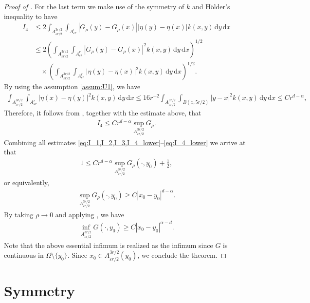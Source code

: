 \documentclass[reqno]{amsart}
\theoremstyle{plain}
\theoremstyle{definition}
\numberwithin{equation}{section}
\newcommand{\dx} {\, \mathrm{d}x}
\newcommand{\dy} {\, \mathrm{d}y}
\begin{document}
\begin{proof} [Proof of ]
For the last term we make use of the symmetry of $k$ and H\"older's inequality to have
\begin{align*}
I_4 
&\leq 2\int_{A^{3r/2}_{\varepsilon r/2}} \int_{A^r_{\varepsilon r}}
| G_{\rho}(y) - G_{\rho}(x) | | \eta(y) - \eta(x) | k(x,y) \dy \dx \\
&\leq 2 \left( \int_{A^{3r/2}_{\varepsilon r/2}} \int_{A^r_{\varepsilon r}}
| G_{\rho}(y) - G_{\rho}(x) |^2 k(x,y) \dy \dx \right)^{1/2} \\
&\quad \times \left( \int_{A^{3r/2}_{\varepsilon r/2}}
\int_{A^r_{\varepsilon r}} | \eta(y) - \eta(x) |^2 k(x,y) \dy \dx \right)^{1/2}.
\end{align*}
By using the assumption \eqref{assum:U1}, we have
\begin{align*}
\int_{A^{3r/2}_{\varepsilon r/2}} \int_{A^r_{\varepsilon r}}
|\eta(x) - \eta(y)|^2 k(x,y) \dy \dx 
\leq 16r^{-2} \int_{A^{3r/2}_{\varepsilon r/2}} \int_{B(x, 5r/2)} 
|y-x|^2 k(x,y) \dy \dx 
\leq Cr^{d-\alpha},
\end{align*}
Therefore, it follows from , together with the estimate above, 
that
\begin{align} \label{eq:I_4_lower}
I_4 \leq C r^{d-\alpha} \sup_{A^{3r/2}_{\varepsilon r/2}} G_{\rho}.
\end{align}
Combining all estimates \eqref{eq:I_1,I_2,I_3,I_4_lower}--\eqref{eq:I_4_lower} 
we arrive at that
\begin{align*}
1 \leq C r^{d-\alpha} \sup_{A^{3r/2}_{\varepsilon r/2}} G_{\rho}(\cdot, y_0) + \frac{1}{2},
\end{align*}
or equivalently,
\begin{align*}
\sup_{A^{3r/2}_{\varepsilon r/2}} G_{\rho}(\cdot, y_0) \geq C | x_0 - y_0 |^{d-\alpha}.
\end{align*}
By taking $\rho \to 0$ and applying , we have
\begin{align*}
\inf_{A^{3r/2}_{\varepsilon r/2}} G(\cdot, y_0) \geq C | x_0 - y_0 |^{\alpha-d}.
\end{align*}
Note that the above essential infimum is realized as the infimum since $G$ is 
continuous in $\Omega \setminus \lbrace y_0 \rbrace$.
Since $x_0 \in A^{3r/2}_{\varepsilon r/2}(y_0)$, we conclude the theorem.
\end{proof}


\section{Symmetry} \label{sec:symmetry}
\end{document}
